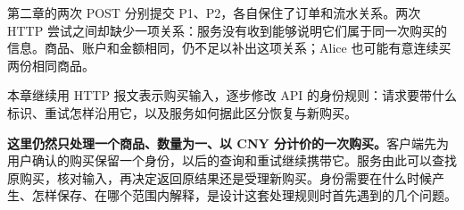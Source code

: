 第二章的两次 POST 分别提交 P1、P2，各自保住了订单和流水关系。两次 HTTP 尝试之间却缺少一项关系：服务没有收到能够说明它们属于同一次购买的信息。商品、账户和金额相同，仍不足以补出这项关系；Alice 也可能有意连续买两份相同商品。

本章继续用 HTTP 报文表示购买输入，逐步修改 API 的身份规则：请求要带什么标识、重试怎样沿用它，以及服务如何据此区分恢复与新购买。

\textbf{这里仍然只处理一个商品、数量为一、以 CNY 分计价的一次购买。}客户端先为用户确认的购买保留一个身份，以后的查询和重试继续携带它。服务由此可以查找原购买，核对输入，再决定返回原结果还是受理新购买。身份需要在什么时候产生、怎样保存、在哪个范围内解释，是设计这套处理规则时首先遇到的几个问题。
